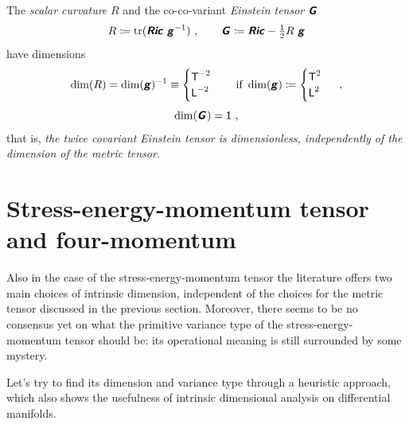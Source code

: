 \documentclass[\ifafour a4paper,12pt,\else a5paper,10pt,\fi%
onecolumn,oneside,article,%
british%
]{memoir}
\makeatletter
\theoremstyle{remark}
\theoremstyle{innote}
\newcommand*{\mathte}[1]{\textbf{\textit{\textsf{#1}}}}
\DeclareMathOperator{\tr}{tr}%
\newcommand*{\defd}{\coloneqq}
\renewcommand*{\|}[1][]{\nonscript\,#1\vert\nonscript\;\mathopen{}}
\newcommand*{\q}{}%
\DeclareRobustCommand*{\q}{%
  \mathord{\mathpalette\bigcdot@{}}%
}
\newcommand*{\bigcdot@scalefactor}{0.7}
\newcommand*{\bigcdot@widthfactor}{1.5}
\newcommand*{\bigcdot@}[2]{%
  \sbox0{$#1\vcenter{}$}%
  \sbox2{$#1\cdot\m@th$}%
  \hbox to \bigcdot@widthfactor\wd2{%
    \hfil
    \raise\ht0\hbox{%
      \scalebox{\bigcdot@scalefactor}{%
        \lower\ht0\hbox{$#1\bullet\m@th$}%
      }%
    }%
    \hfil
  }%
}
\newcommand*{\Un}{\textsf{1}}
\newcommand*{\Le}{\textsf{L}}
\newcommand*{\Ti}{\textsf{T}}
\newcommand*{\yg}{\mathte{g}}
\newcommand*{\yG}{\mathte{G}}
\newcommand*{\yRi}{\mathte{Ric}}
\newcommand*{\ysc}{R}
\renewcommand*{\i}{\indices}
\makeatother
\begin{document}
\medskip

The \emph{scalar curvature} $\ysc$ and the co-co-variant \emph{Einstein
  tensor} $\yG\i{_{\q\q}}$
\begin{equation}
  \label{eq:curv_einst}
  \ysc \defd %
  \tr(\yRi\ \yg^{-1})
  \ ,
  \qquad
  \yG\i{_{\q\q}} \defd \yRi -%
  \tfrac{1}{2} \ysc\ \yg %
\end{equation}
have  dimensions
\begin{gather}
  \label{eq:dim_scalcurv}
  \dim(\ysc) = \dim(\yg)^{-1} \equiv
  \begin{cases}
    \Ti^{-2} \\
    \Le^{-2}
  \end{cases}
  \quad\text{if }\dim(\yg)\defd
  \begin{cases}
     \Ti^2 \\
    \Le^2
  \end{cases}\ ,
  \\[\jot]
  \label{eq:dim_einst}
  \dim(\yG\i{_{\q\q}}) = \Un \ ,
\end{gather}
that is, \emph{the twice covariant Einstein tensor is dimensionless,
  independently of the dimension of the metric tensor}.

\section{Stress-energy-momentum tensor and four-momentum}
\label{sec:stressenergy}

Also in the case of the stress-energy-momentum tensor the literature offers
two main choices of intrinsic dimension, independent of the choices for the
metric tensor discussed in the previous section. Moreover, there seems to
be no consensus yet on what the primitive variance type of the
stress-energy-momentum tensor should be: its operational meaning is still
surrounded by some mystery.

Let's try to find its dimension and variance type through a heuristic
approach, which also shows the usefulness of intrinsic dimensional analysis
on differential manifolds.
\end{document}
